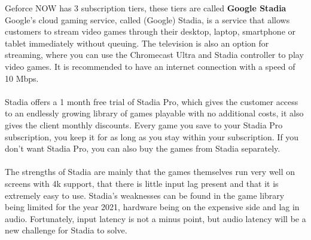 Geforce NOW has 3 subscription tiers, these tiers are called
\textbf{Google Stadia}\\
Google's cloud gaming service, called (Google) Stadia, is a service that allows customers to stream video games through their desktop, laptop, smartphone or tablet immediately without queuing. The television is also an option for streaming, where you can use the Chromecast Ultra and Stadia controller to play video games. It is recommended to have an internet connection with a speed of 10 Mbps.\\\\
Stadia offers a 1 month free trial of Stadia Pro, which gives the customer access to an endlessly growing library of games playable with no additional costs, it also gives the client monthly discounts. Every game you save to your Stadia Pro subscription, you keep it for as long as you stay within your subscription. If you don't want Stadia Pro, you can also buy the games from Stadia separately.\\\\
The strengths of Stadia are mainly that the games themselves run very well on screens with 4k support, that there is little input lag present and that it is extremely easy to use. Stadia's weaknesses can be found in the game library being limited for the year 2021, hardware being on the expensive side and lag in audio. Fortunately, input latency is not a minus point, but audio latency will be a new challenge for Stadia to solve.\\\\
